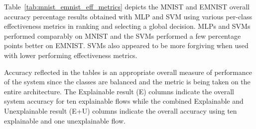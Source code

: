 \begin{table}[H]
    \renewcommand{\arraystretch}{1.3}
     \label{table:exexample4epars}
    \begin{center}
    \end{center}
\end{table}   

Table~\ref{tab:mnist_emnist_eff_metrics} depicts the MNIST and EMNIST overall
accuracy percentage results obtained with MLP and SVM using various per-class
effectiveness metrics in ranking and selecting a global decision. MLPs and SVMs
performed comparably on MNIST and the SVMs performed a few percentage points
better on EMNIST.  SVMs also appeared to be more forgiving when used with lower
performing effectiveness metrics. 

Accuracy reflected in the tables is an appropriate overall measure of
performance of the system since the classes are balanced and the metric is being
taken on the entire architecture. The Explainable result (E) columns indicate
the overall system accuracy for ten explainable flows while the combined
Explainable and Unexplainable result (E+U) columns indicate the overall
accuracy using ten explainable and one unexplainable flow.

